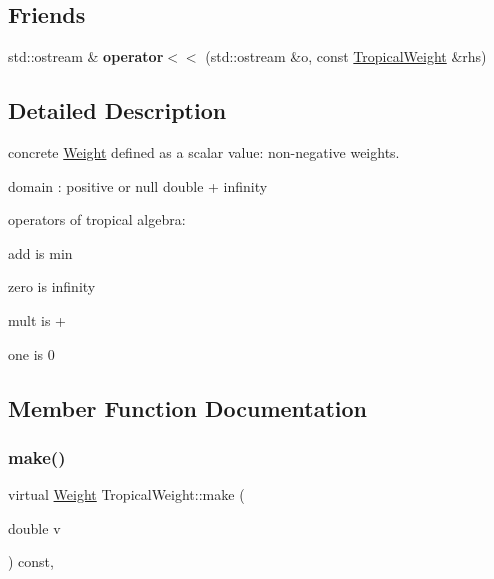 \subsection*{Friends}
\begin{DoxyCompactItemize}
\item 
\mbox{\label{classTropicalWeight_a107c4982b748f9650aed701ccb27bf21}} 
std\+::ostream \& {\bfseries operator$<$$<$} (std\+::ostream \&o, const \mbox{\hyperlink{classTropicalWeight}{Tropical\+Weight}} \&rhs)
\end{DoxyCompactItemize}


\subsection{Detailed Description}
concrete \mbox{\hyperlink{classWeight}{Weight}} defined as a scalar value\+: non-\/negative weights. 


\begin{DoxyItemize}
\item domain \+: positive or null double + infinity
\item operators of tropical algebra\+:
\item add is min
\item zero is infinity
\item mult is +
\item one is 0 
\end{DoxyItemize}

\subsection{Member Function Documentation}
\mbox{\label{classTropicalWeight_abc00c8fe56beedff6b7192325833d6d3}} 
\subsubsection{\texorpdfstring{make()}{make()}}
{\footnotesize\ttfamily virtual \mbox{\hyperlink{classWeight}{Weight}} Tropical\+Weight\+::make (\begin{DoxyParamCaption}\item[{double}]{v }\end{DoxyParamCaption}) const\hspace{0.3cm}{\ttfamily [inline]}, {\ttfamily [virtual]}}

